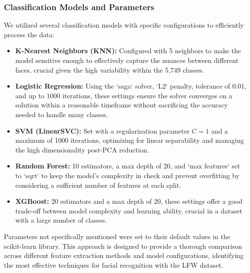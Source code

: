 \documentclass[a4paper]{article}
\theoremstyle{plain}
\theoremstyle{definition}
\begin{document}
\subsubsection*{Classification Models and Parameters}
We utilized several classification models with specific configurations to efficiently process the data:
\begin{itemize}
    \item \textbf{K-Nearest Neighbors (KNN):} Configured with 5 neighbors to make the model sensitive enough to effectively capture the nuances between different faces, crucial given the high variability within the 5,749 classes.
    \item \textbf{Logistic Regression:} Using the `saga` solver, `L2` penalty, tolerance of 0.01, and up to 1000 iterations, these settings ensure the solver converges on a solution within a reasonable timeframe without sacrificing the accuracy needed to handle many classes.
    \item \textbf{SVM (LinearSVC):} Set with a regularization parameter \(C = 1\) and a maximum of 1000 iterations, optimizing for linear separability and managing the high dimensionality post-PCA reduction.
    \item \textbf{Random Forest:} 10 estimators, a max depth of 20, and `max features` set to `sqrt` to keep the model's complexity in check and prevent overfitting by considering a sufficient number of features at each split.
    \item \textbf{XGBoost:} 20 estimators and a max depth of 20, these settings offer a good trade-off between model complexity and learning ability, crucial in a dataset with a large number of classes.
\end{itemize}

Parameters not specifically mentioned were set to their default values in the scikit-learn library. This approach is designed to provide a thorough comparison across different feature extraction methods and model configurations, identifying the most effective techniques for facial recognition with the LFW dataset.
\end{document}
